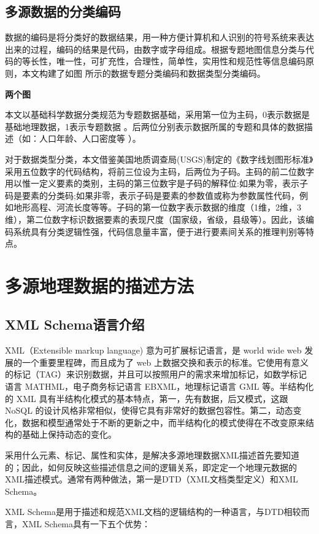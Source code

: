 \documentclass[master]{njnuthesis}
\begin{document}
\subsection{多源数据的分类编码}
数据的编码是将分类好的数据结果，用一种方便计算机和人识别的符号系统来表达出来的过程，编码的结果是代码，由数字或字母组成。根据专题地图信息分类与代码的等长性，唯一性，可扩充性，合理性，简单性，实用性和规范性等信息编码原则，本文构建了如图  所示的数据专题分类编码和数据类型分类编码。

\textbf{两个图}

本文以基础科学数据分类规范为专题数据基础，采用第一位为主码，0表示数据是基础地理数据，1表示专题数据 。后两位分别表示数据所属的专题和具体的数据描述（如：人口年龄、人口密度等 ）。

对于数据类型分类，本文借鉴美国地质调查局(USGS)制定的《数字线划图形标准》采用五位数字的代码结构，将前三位设为主码，后两位为子码。主码的前二位数字用以惟一定义要素的类别，主码的第三位数宇是子码的解释位:如果为零，表示子码是要素的分类码;如果非零，表示子码是要素的参数值或称为参数属性代码，例如地形高程、河流长度等等。子码的第一位数字表示数据的维度（1维，2维，3维），第二位数字标识数据要素的表现尺度（国家级，省级，县级等）。因此，该编码系统具有分类逻辑性强，代码信息量丰富，便于进行要素间关系的推理判别等特点。

\section{多源地理数据的描述方法}
\subsection{XML Schema语言介绍}
XML（Extensible markup language) 意为可扩展标记语言，是 world wide web 发展的一个重要里程碑，而且成为了 web 上数据交换和表示的标准。它使用有意义的标记（TAG）来识别数据，并且可以按照用户的需求来增加标记，如数学标记语言 MATHML，电子商务标记语言 EBXML，地理标记语言 GML 等。半结构化的 XML 具有半结构化模式的基本特点，第一，先有数据，后又模式，这跟 NoSQL 的设计风格非常相似，使得它具有非常好的数据包容性。第二，动态变化，数据和模型通常处于不断的更新之中，而半结构化的模式使得在不改变原来结构的基础上保持动态的变化。

采用什么元素、标记、属性和实体，是解决多源地理数据XML描述首先要知道的；因此，如何反映这些描述信息之间的逻辑关系，即定定一个地理元数据的XML描述模式。通常有两种做法，第一是DTD（XML文档类型定义）和XML Schema。

XML Schema是用于描述和规范XML文档的逻辑结构的一种语言，与DTD相较而言，XML Schema具有一下五个优势：
\end{document}
